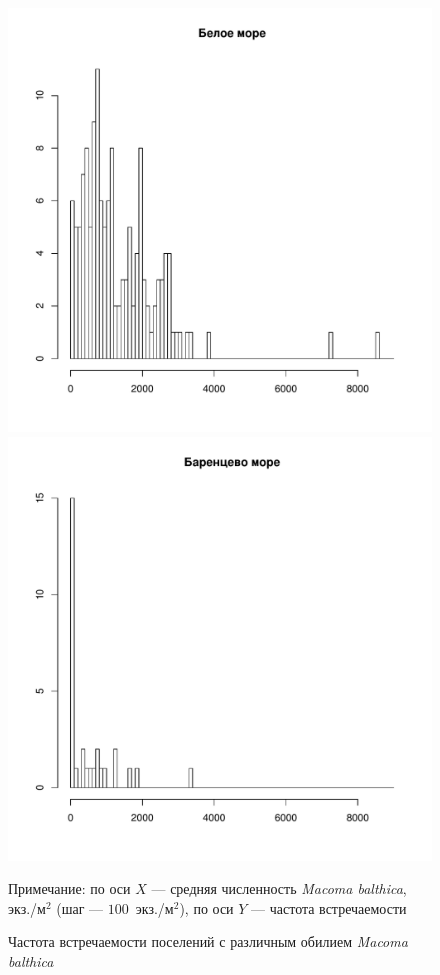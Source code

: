 	\begin{figure}[ht]
		\includegraphics[height=.3\textheight]{../All_N/Nmean_hist_White.pdf}
		\includegraphics[height=.3\textheight]{../All_N/Nmean_hist_Barents.pdf}
	\caption{Частота встречаемости поселений с различным обилием {\it Macoma balthica}}
	{\footnotesize Примечание: по оси $X$ --- средняя численность {\it Macoma balthica}, экз./м$^2$ (шаг --- $100$~экз./м$^2$), по оси $Y$ 	--- частота встречаемости}
	\label{ris:Nmean_hist}
	\end{figure}
